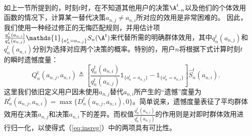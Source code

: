 如上一节所提到的，时刻$t$时，在不知道其他用户的决策$\A^t_{-n}$以及他们的个体效用函数的情况下，计算某一替代决策$a_{n,j}\neq a_{n,i}$所对应的效用是非常困难的。
因此，我们使用一种经过修正的无悔匹配规则\cite{Hart_areinforcement}，并用估计项$\frac{q^t_n(a_{n,i})}{q^t_n(a_{n,j})}\mathds{1}_{\{a^t_n=a_{n,j}\}}S_n(\A^t)$来代替所需的明确群体效用，其中$q^t_n(a_{n,j})$和$q^t_n(a_{n,i})$分别为选择对应两个决策的概率。特别的，用户$n$将根据下式计算时刻$t$的瞬时遗憾度量：
\begin{equation}\label{eq:insreg}
Q^t_n(a_{n,j},a_{n,i})\triangleq\left[\frac{q^t_n(a_{n,i})}{q^t_n(a_{n,j})}\mathds{1}_{\{a^t_n=a_{n,j}\}}-\mathds{1}_{\{a^t_n=a_{n,i}\}}\right]\hat{S}^t_n(a_{n,i}).
\end{equation}
这里我们依旧定义用户因未使用$a_{n,j}$替代$a_{n,i}$所产生的“遗憾”度量为$R_n^t(a_{n,j},a_{n,i})=\max\{D_n^t(a_{n,j},a_{n,i}),0\}$。简单说来，遗憾度量表征了平均群体效用在决策$a_{n,j}$和决策$a_{n,i}$下的差异。而权值$\frac{q^t_n(a_{n,i})}{q^t_n(a_{n,j})}$的作用则是对即时群体效用进行归一化，以使得式（\ref{eq:insreg}）中的两项具有可比性。

